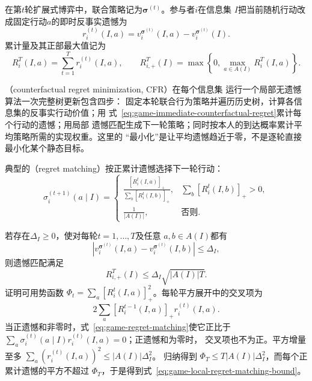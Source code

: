 在第\(t\)轮扩展式博弈中，联合策略记为\(\bm{\sigma}^{(t)}\)。参与者\(i\)在信息集
\(I\)把当前随机行动改成固定行动\(a\)的即时反事实遗憾为
\begin{equation}
  r_i^{(t)}(I,a)
  =
  v_i^{\bm{\sigma}^{(t)}}(I,a)
  -
  v_i^{\bm{\sigma}^{(t)}}(I).
  \label{eq:game-immediate-counterfactual-regret}
\end{equation}
累计量及其正部最大值记为
\[
  R_i^T(I,a)
  =
  \sum_{t=1}^{T}r_i^{(t)}(I,a),
  \qquad
  R_{i,+}^T(I)
  =
  \max\left\{0,\max_{a\in A(I)}R_i^T(I,a)\right\}.
\]

（counterfactual regret minimization, CFR）在每个信息集
运行一个局部无遗憾算法一次完整树更新包含四步：
固定本轮联合行为策略并遍历历史树，计算各信息集的反事实行动价值；用
式~\eqref{eq:game-immediate-counterfactual-regret}累计每个行动的遗憾；用局部
遗憾匹配生成下一轮策略；同时按本人的到达概率累计平均策略所需的实现权重。这里的
“最小化”是让平均遗憾趋近于零，不是逐轮直接最小化某个静态目标。

典型的（regret matching）按正累计遗憾选择下一轮行动：
\begin{equation}
  \sigma_i^{(t+1)}(a\mid I)
  =
  \begin{cases}
    \displaystyle
    \frac{[R_i^t(I,a)]_+}
         {\sum_b[R_i^t(I,b)]_+},
      &\sum_b[R_i^t(I,b)]_+>0,\\[8pt]
    \displaystyle\frac{1}{|A(I)|},
      &\text{否则}.
  \end{cases}
  \label{eq:game-regret-matching}
\end{equation}

若存在\(\Delta_I\geq0\)，使对每轮\(t=1,\ldots,T\)及任意
\(a,b\in A(I)\)都有
\[
  \left|
    v_i^{\bm{\sigma}^{(t)}}(I,a)
    -
    v_i^{\bm{\sigma}^{(t)}}(I,b)
  \right|
  \leq\Delta_I,
\]
则遗憾匹配满足
\begin{equation}
  R_{i,+}^T(I)
  \leq
  \Delta_I\sqrt{|A(I)|T}.
  \label{eq:game-local-regret-matching-bound}
\end{equation}
证明可用势函数
\(\Phi_t=\sum_a[R_i^t(I,a)]_+^2\)。每轮平方展开中的交叉项为
\[
  2\sum_a[R_i^{t-1}(I,a)]_+r_i^{(t)}(I,a).
\]
当正遗憾和非零时，式~\eqref{eq:game-regret-matching}使它正比于
\(\sum_a\sigma_i^{(t)}(a\mid I)r_i^{(t)}(I,a)=0\)；正遗憾和为零时，
交叉项也不为正。平方增量至多
\(\sum_a(r_i^{(t)}(I,a))^2\leq |A(I)|\Delta_I^2\)。
归纳得到
\(\Phi_T\leq T|A(I)|\Delta_I^2\)，而每个正累计遗憾的平方不超过
\(\Phi_T\)，于是得到式~\eqref{eq:game-local-regret-matching-bound}。

